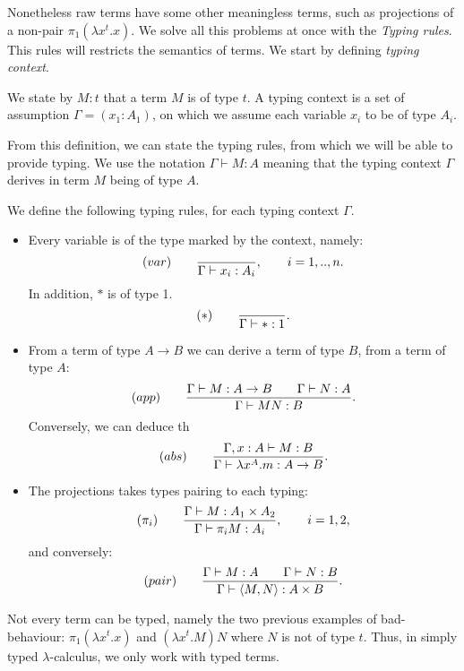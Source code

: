 Nonetheless raw terms have some other meaningless terms, such as projections of a non-pair $\pi_1(\lambda x^t.x)$. We solve all this problems at once with the \emph {Typing rules}. This rules will restricts the semantics of terms. We start by defining \emph{typing context}.

\begin{definition}
We state by $M:t$  that a term $M$ is of type $t$. A typing context is a set of assumption $\Gamma = (x_1:A_1)$, on which we assume each variable $x_i$ to be of type $A_i$.
\end{definition}

\begin{remark}
  From this definition, we can state the typing rules, from which we will be able to provide typing. We use the notation $\Gamma \vdash M:A$ meaning that the typing context $\Gamma$ derives in term $M$ being of type $A$. 
\end{remark}


\begin{definition}\label{def:typing-rules}
  We define the following typing rules, for each typing context $\Gamma$.
  \begin{itemize}
    \item Every variable is of the type marked by the context, namely:
$$  (var)\qquad  {\displaystyle \over \Gamma \vdash x_i:A_i},\qquad  i=  1,..,n.$$
In addition,  $*$ is of type 1.
    $$  (*)\qquad  {\displaystyle \over \Gamma\vdash *:1}.$$

\item From a term of type $A\to B$ we can derive a term of type $B$, from a term of type $A$:
  $$(app)\qquad  {\displaystyle \Gamma \vdash M:A\to B\qquad \Gamma \vdash N:A      \over \Gamma \vdash MN:B}.$$
  Conversely, we can deduce th
  $$(abs)\qquad  {\displaystyle \Gamma, x: A\vdash M: B  \over \Gamma \vdash \lambda x^A.m:A\to B}.$$
\item The projections takes types pairing to each typing:
  $$(\pi_i) \qquad {\displaystyle \Gamma\vdash M: A_1\times A_2 \over \Gamma \vdash \pi_i M: A_i},\qquad i=1,2,$$
and conversely:
    $$(pair) \qquad {\displaystyle \Gamma\vdash M: A\qquad \Gamma\vdash N: B \over \Gamma \vdash \langle M, N\rangle:  A\times B}.$$
  \end{itemize}
\end{definition}



\begin{remark}
  Not every term can be typed, namely the two previous examples of bad-behaviour: $\pi_1(\lambda x^t. x)$ and $(\lambda x^t.M)N$ where $N$ is not of type $t$. Thus, in simply typed $\lambda$-calculus, we only work with typed terms.
\end{remark}

